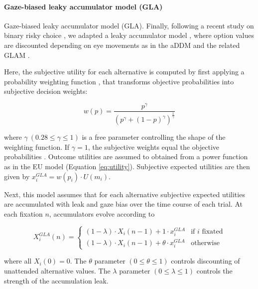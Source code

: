 \documentclass[11pt, a4paper]{article}
\begin{document}
\paragraph{Gaze-biased leaky accumulator model (GLA)}

Gaze-biased leaky accumulator model (GLA). Finally, following a recent study on binary risky choice \parencite{glickman2019FormationPreferenceRisky}, we adapted a leaky accumulator model \parencite{usher2001TimeCoursePerceptual}, where option values are discounted depending on eye movements as in the aDDM \parencite{krajbich2010VisualFixationsComputation,krajbich2011MultialternativeDriftdiffusionModel} and the related GLAM \parencite{molter2019GLAMboxPythonToolbox,thomas2019GazeBiasDifferences}.

Here, the subjective utility for each alternative is computed by first applying a probability weighting function \parencite{tversky1992AdvancesProspectTheory}, that transforms objective probabilities into subjective decision weights:

\begin{equation}
    \label{eq:pweighting}
    w(p) = \frac{p^\gamma}{(p^\gamma + (1 - p)^\gamma)^{\frac{1}{\gamma}}}
\end{equation}

where $\gamma~(0.28 \le \gamma \le 1)$ is a free parameter controlling the shape of the weighting function. If $\gamma = 1$, the subjective weights equal the objective probabilities \parencite{cavagnaro2013DiscriminatingProbabilityWeighting}. Outcome utilities are assumed to obtained from a power function as in the EU model (Equation \ref{eq:utility}). Subjective expected utilities are then given by $x_i^{GLA} = w(p_i) \cdot U(m_i)$.

Next, this model assumes that for each alternative subjective expected utilities are accumulated with leak and gaze bias over the time course of each trial. At each fixation $n$, accumulators evolve according to

\begin{equation}
    X_i^{GLA}(n) = \begin{cases}
             (1 - \lambda) \cdot X_i(n - 1) + 1 \cdot x_i^{GLA} &\text{if $i$ fixated}\\
             (1 - \lambda) \cdot X_i(n - 1) + \theta \cdot x_i^{GLA} &\text{otherwise}
             \end{cases}
\end{equation}

where all $X_i(0) = 0$. The $\theta$ parameter $(0 \le \theta \le 1)$ controls discounting of unattended alternative values. The $\lambda$ parameter $(0 \le \lambda \le 1)$ controls the strength of the accumulation leak.
\end{document}
